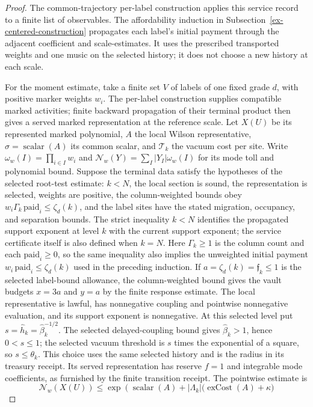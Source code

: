 \begin{proof}
The common-trajectory per-label construction applies this service record to a finite list of observables. The affordability induction in Subsection~\ref{ex-centered-construction} propagates each label's initial payment through the adjacent coefficient and scale-estimates. It uses the prescribed transported weights and one music on the selected history; it does not choose a new history at each scale.

For the moment estimate, take a finite set $V$ of labels of one fixed grade $d$, with positive marker weights $w_i$. The per-label construction supplies compatible marked activities; finite backward propagation of their terminal product then gives a served marked representation at the reference scale. Let $X(U)$ be its represented marked polynomial, $A$ the local Wilson representative, $\sigma=\operatorname{scalar}(A)$ its common scalar, and $\mathcal T_k$ the vacuum cost per site. Write $\omega_w(I)=\prod_{i\in I}w_i$ and $\mathcal N_w(Y)=\sum_I|Y_I|\omega_w(I)$ for its mode toll and polynomial bound. Suppose the terminal data satisfy the hypotheses of the selected root-test estimate: $k<N$, the local section is sound, the representation is selected, weights are positive, the column-weighted bounds obey $w_i\Gamma_k\,\mathrm{paid}_i\leq\zeta_d(k)$, and the label sites have the stated migration, occupancy, and separation bounds. The strict inequality $k<N$ identifies the propagated support exponent at level $k$ with the current support exponent; the service certificate itself is also defined when $k=N$. Here $\Gamma_k\geq1$ is the column count and each $\mathrm{paid}_i\geq0$, so the same inequality also implies the unweighted initial payment $w_i\,\mathrm{paid}_i\leq\zeta_d(k)$ used in the preceding induction. If $a=\zeta_d(k)=\mathfrak f_k\leq1$ is the selected label-bound allowance, the column-weighted bound gives the vault budgets $x=3a$ and $y=a$ by the finite response estimate. The local representative is lawful, has nonnegative coupling and pointwise nonnegative evaluation, and its support exponent is nonnegative. At this selected level put $s=\widehat h_k=\widehat\beta_k^{-1/2}$. The selected delayed-coupling bound gives $\widehat\beta_k>1$, hence $0<s\leq1$; the selected vacuum threshold is $s$ times the exponential of a square, so $s\leq\theta_k$. This choice uses the same selected history and is the radius in its treasury receipt. Its served representation has reserve $f=1$ and integrable mode coefficients, as furnished by the finite transition receipt. The pointwise estimate is
\[
 \mathcal N_w(X(U))\leq
 \exp\!\left(\operatorname{scalar}(A)+|\Lambda_k|\bigl(\operatorname{exCost}(A)+\kappa\bigr)
\]
\end{proof}
